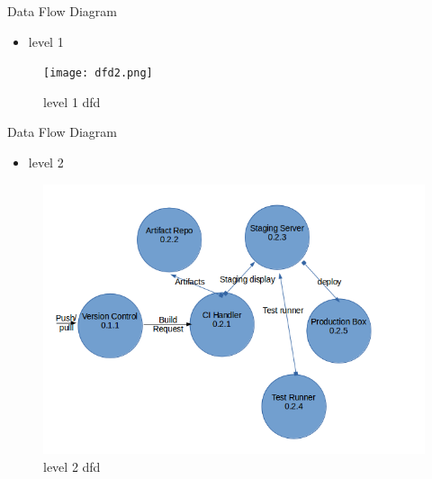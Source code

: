 \documentclass{beamer}
\begin{document}
\begin{frame}{Data Flow Diagram}
\begin{itemize}
\item level 1
\end{itemize}
\begin{figure}[h]
\begin{center}
\texttt{[image: dfd2.png]}
\caption{level 1 dfd}
\end{center}
\end{figure}
\end{frame}

\begin{frame}{Data Flow Diagram}
\begin{itemize}
\item level 2
\end{itemize}
\begin{figure}[h]
\begin{center}
\includegraphics[scale=0.28]{dfd3.png}
\caption{level 2 dfd}
\end{center}
\end{figure}
\end{frame}
\end{document}
